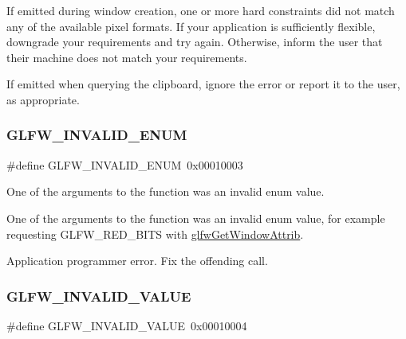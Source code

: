 If emitted during window creation, one or more hard constraints did not match any of the available pixel formats. If your application is sufficiently flexible, downgrade your requirements and try again. Otherwise, inform the user that their machine does not match your requirements.

\begin{DoxyParagraph}{}
If emitted when querying the clipboard, ignore the error or report it to the user, as appropriate. 
\end{DoxyParagraph}
\mbox{\label{group__errors_ga76f6bb9c4eea73db675f096b404593ce}} 
\subsubsection{\texorpdfstring{G\+L\+F\+W\+\_\+\+I\+N\+V\+A\+L\+I\+D\+\_\+\+E\+N\+UM}{GLFW\_INVALID\_ENUM}}
{\footnotesize\ttfamily \#define G\+L\+F\+W\+\_\+\+I\+N\+V\+A\+L\+I\+D\+\_\+\+E\+N\+UM~0x00010003}



One of the arguments to the function was an invalid enum value. 

One of the arguments to the function was an invalid enum value, for example requesting G\+L\+F\+W\+\_\+\+R\+E\+D\+\_\+\+B\+I\+TS with \hyperlink{group__window_ga1bb0c7e100418e284dbb800789c63d40}{glfw\+Get\+Window\+Attrib}.

Application programmer error. Fix the offending call. \mbox{\label{group__errors_gaaf2ef9aa8202c2b82ac2d921e554c687}} 
\subsubsection{\texorpdfstring{G\+L\+F\+W\+\_\+\+I\+N\+V\+A\+L\+I\+D\+\_\+\+V\+A\+L\+UE}{GLFW\_INVALID\_VALUE}}
{\footnotesize\ttfamily \#define G\+L\+F\+W\+\_\+\+I\+N\+V\+A\+L\+I\+D\+\_\+\+V\+A\+L\+UE~0x00010004}



